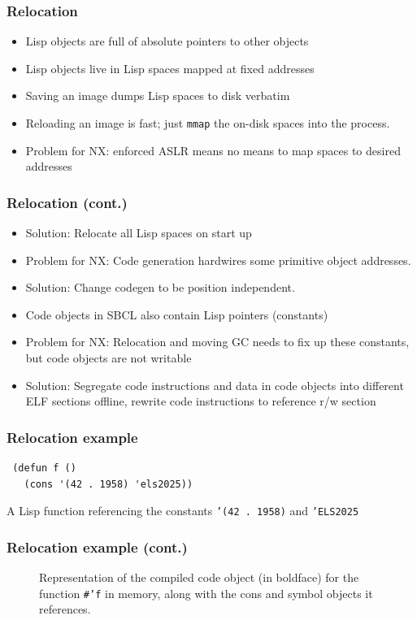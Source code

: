 \documentclass[14pt,t,aspectratio=169]{beamer}
\def\code#1{{\color{codecolor}\texttt{#1}}}
\begin{document}
\begin{frame}
  \frametitle{Relocation}
  \begin{itemize}
  \item Lisp objects are full of absolute pointers to other objects
  \item Lisp objects live in Lisp spaces mapped at fixed addresses
  \item Saving an image dumps Lisp spaces to disk verbatim
  \item Reloading an image is fast; just \texttt{mmap} the on-disk
    spaces into the process.
  \item \Rightarrow{} Problem for NX: enforced ASLR means no means to map spaces
    to desired addresses
  \end{itemize}
\end{frame}

\begin{frame}
  \frametitle{Relocation (cont.)}
  \begin{itemize}
    \item Solution: Relocate all Lisp spaces on start up
    \item \Rightarrow{} Problem for NX: Code generation hardwires some primitive
      object addresses.
    \item Solution: Change codegen to be position independent.
    \item Code objects in SBCL also contain Lisp pointers (constants)
    \item \Rightarrow{} Problem for NX: Relocation and moving GC needs to fix up
      these constants, but code objects are not writable
    \item Solution: Segregate code instructions and data in code
      objects into different ELF sections offline, rewrite code
      instructions to reference r/w section
  \end{itemize}
\end{frame}

\begin{frame}[fragile]
  \frametitle{Relocation example}
\begin{verbatim}
 (defun f ()
   (cons '(42 . 1958) 'els2025))
\end{verbatim}
  A Lisp function referencing the constants \code{'(42 . 1958)} and \code{'ELS2025}
\end{frame}

\begin{frame}
  \frametitle{Relocation example (cont.)}
  \begin{figure}[h]
    \centering
    
    \caption{Representation of the compiled code object (in boldface)
      for the function \protect\texttt{\#'f} in memory, along with the
      cons and symbol objects it references.}
    \label{fig:before-shrinkwrap}
  \end{figure}
\end{frame}
\end{document}
